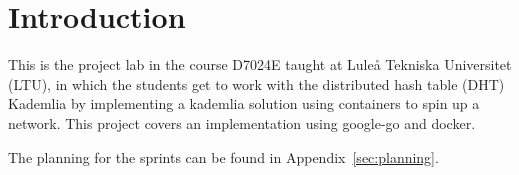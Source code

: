 \section{Introduction}\label{sec:introduction}

This is the project lab in the course D7024E taught at Luleå Tekniska
Universitet (LTU), in which the students get to work with the distributed hash
table (DHT) Kademlia by implementing a kademlia solution using containers to
spin up a network. This project covers an implementation using google-go and
docker.

The planning for the sprints can be found in Appendix~\ref{sec:planning}.
